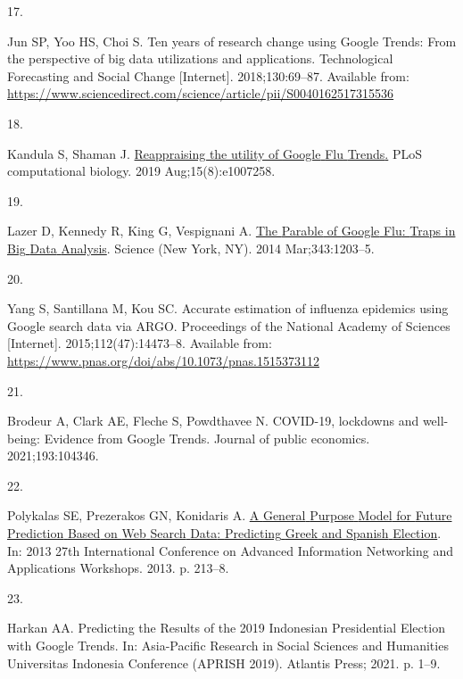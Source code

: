 \documentclass[
  letterpaper,
  DIV=11,
  numbers=noendperiod]{scrartcl}
\newlength{\cslhangindent}
\newlength{\csllabelwidth}
\newlength{\cslentryspacingunit} %
\newenvironment{CSLReferences}[2] %
 {%
  \setlength{\parindent}{0pt}
  \ifodd #1
  \let\oldpar\par
  \def\par{\hangindent=\cslhangindent\oldpar}
  \fi
  \setlength{\parskip}{#2\cslentryspacingunit}
 }%
 {}
\newcommand{\CSLLeftMargin}[1]{\parbox[t]{\csllabelwidth}{#1}}
\newcommand{\CSLRightInline}[1]{\parbox[t]{\linewidth - \csllabelwidth}{#1}\break}
\begin{document}
\begin{CSLReferences}{0}{0}
\leavevmode{}%
\CSLLeftMargin{17. }%
\CSLRightInline{Jun SP, Yoo HS, Choi S. Ten years of research change
using {Google} {Trends}: {From} the perspective of big data utilizations
and applications. Technological Forecasting and Social Change
{[}Internet{]}. 2018;130:69--87. Available from:
\url{https://www.sciencedirect.com/science/article/pii/S0040162517315536}}

\leavevmode{}%
\CSLLeftMargin{18. }%
\CSLRightInline{Kandula S, Shaman J.
\href{https://doi.org/10.1371/journal.pcbi.1007258}{Reappraising the
utility of {Google} {Flu} {Trends}.} PLoS computational biology. 2019
Aug;15(8):e1007258. }

\leavevmode{}%
\CSLLeftMargin{19. }%
\CSLRightInline{Lazer D, Kennedy R, King G, Vespignani A.
\href{https://doi.org/10.1126/science.1248506}{The {Parable} of {Google}
{Flu}: {Traps} in {Big} {Data} {Analysis}}. Science (New York, NY). 2014
Mar;343:1203--5. }

\leavevmode{}%
\CSLLeftMargin{20. }%
\CSLRightInline{Yang S, Santillana M, Kou SC. Accurate estimation of
influenza epidemics using {Google} search data via {ARGO}. Proceedings
of the National Academy of Sciences {[}Internet{]}.
2015;112(47):14473--8. Available from:
\url{https://www.pnas.org/doi/abs/10.1073/pnas.1515373112}}

\leavevmode{}%
\CSLLeftMargin{21. }%
\CSLRightInline{Brodeur A, Clark AE, Fleche S, Powdthavee N. {COVID}-19,
lockdowns and well-being: {Evidence} from {Google} {Trends}. Journal of
public economics. 2021;193:104346. }

\leavevmode{}%
\CSLLeftMargin{22. }%
\CSLRightInline{Polykalas SE, Prezerakos GN, Konidaris A.
\href{https://doi.org/10.1109/WAINA.2013.155}{A {General} {Purpose}
{Model} for {Future} {Prediction} {Based} on {Web} {Search} {Data}:
{Predicting} {Greek} and {Spanish} {Election}}. In: 2013 27th
{International} {Conference} on {Advanced} {Information} {Networking}
and {Applications} {Workshops}. 2013. p. 213--8. }

\leavevmode{}%
\CSLLeftMargin{23. }%
\CSLRightInline{Harkan AA. Predicting the {Results} of the 2019
{Indonesian} {Presidential} {Election} with {Google} {Trends}. In:
Asia-{Pacific} {Research} in {Social} {Sciences} and {Humanities}
{Universitas} {Indonesia} {Conference} ({APRISH} 2019). Atlantis Press;
2021. p. 1--9. }


\end{CSLReferences}
\end{document}

